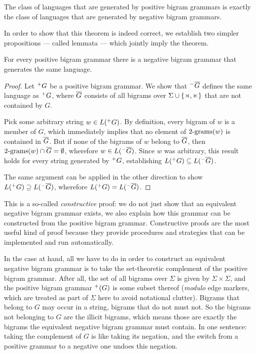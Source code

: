 \begin{theorem}
    The class of languages that are generated by positive bigram grammars is exactly the class of languages that are generated by negative bigram grammars.
    \label{thm:SL_PosNegEquivalence}
\end{theorem}
%
In order to show that this theorem is indeed correct, we establish two simpler propositions --- called lemmata --- which jointly imply the theorem.

\begin{lemma}
    For every positive bigram grammar there is a negative bigram grammar that generates the same language.
    \label{lem:SL_Pos2Neg}
\end{lemma}
%
\begin{proof}
    Let $^+ G$ be a positive bigram grammar. 
    We show that $^-  \overline{G} $ defines the same language as $^+ G$, where $ \overline{G} $ consists of all bigrams over $\Sigma \cup \left \{ \rtimes, \ltimes \right \}$ that are not contained by $G$.

    Pick some arbitrary string $w \in L(^+ G)$. 
    By definition, every bigram of $w$ is a member of $G$, which immediately implies that no element of $2\mathrm{\text{-}grams}(w)$ is contained in $ \overline{G} $.
    But if none of the bigrams of $w$ belong to $ \overline{G} $, then $2\mathrm{\text{-}grams}(w) \cap  \overline{G}  = \emptyset$, wherefore $w \in L(^-  \overline{G} )$.
    Since $w$ was arbitrary, this result holds for every string generated by $^+ G$, establishing $L(^+ G) \subseteq L(^-  \overline{G} )$.

    The same argument can be applied in the other direction to show $L(^+ G) \supseteq L(^-  \overline{G} )$, wherefore $L(^+ G) = L(^-  \overline{G} )$.
\end{proof}
%
This is a so-called \emph{constructive} proof: we do not just show that an equivalent negative bigram grammar exists, we also explain how this grammar can be constructed from the positive bigram grammar.
Constructive proofs are the most useful kind of proof because they provide procedures and strategies that can be implemented and run automatically.

In the case at hand, all we have to do in order to construct an equivalent negative bigram grammar is to take the set-theoretic complement of the positive bigram grammar.
After all, the set of all bigrams over $\Sigma$ is given by $\Sigma \times \Sigma$, and the positive bigram grammar $^+ (G)$ is some subset thereof (\emph{modulo} edge markers, which are treated as part of $\Sigma$ here to avoid notational clutter).
Bigrams that belong to $G$ may occur in a string, bigrams that do not must not.
So the bigrams not belonging to $G$ are the illicit bigrams, which means those are exactly the bigrams the equivalent negative bigram grammar must contain.
In one sentence: taking the complement of $G$ is like taking its negation, and the switch from a positive grammar to a negative one undoes this negation.

